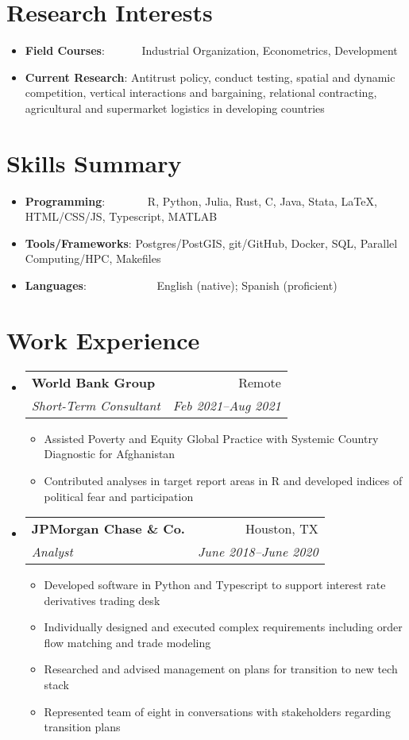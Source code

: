 \documentclass[a4paper,20pt]{article}
\makeatletter
\newcommand{\resumeItem}[2]{
  \item\small{
    \textbf{#1}{: #2 \vspace{-2pt}}
  }
}
\newcommand{\resumeSubheading}[4]{
  \vspace{-1pt}\item
    \begin{tabular*}{0.97\textwidth}{l@{\extracolsep{\fill}}r}
      \textbf{#1} & #2 \\
      \textit{#3} & \textit{#4} \\
    \end{tabular*}\vspace{-5pt}
}
\newcommand{\resumeSubItem}[2]{\resumeItem{#1}{#2}\vspace{-3pt}}
\newcommand{\resumeSubHeadingListStart}{\begin{itemize}[leftmargin=*]}
\newcommand{\resumeSubHeadingListEnd}{\end{itemize}}
\newcommand{\resumeItemListStart}{\begin{itemize}}
\newcommand{\resumeItemListEnd}{\end{itemize}\vspace{-5pt}}
\makeatother
\begin{document}
\section{Research Interests}
\begin{itemize}[leftmargin=*, itemindent=-9em]
  \resumeSubItem{Field Courses}{~~~~~~Industrial Organization, Econometrics, Development}
  \resumeSubItem{Current Research}{Antitrust policy, conduct testing, spatial and dynamic competition, vertical interactions and bargaining, relational contracting, agricultural and supermarket logistics in developing countries}
  \resumeSubHeadingListEnd
	    
\vspace{-5pt}
\section{Skills Summary}
	\resumeSubHeadingListStart
	\resumeSubItem{Programming}{~~~~~~~R, Python, Julia, Rust, C, Java, Stata, LaTeX, HTML/CSS/JS, Typescript, MATLAB}
	\resumeSubItem{Tools/Frameworks}{Postgres/PostGIS, git/GitHub, Docker, SQL, Parallel Computing/HPC, Makefiles}
	\resumeSubItem{Languages}{~~~~~~~~~~~~English (native); Spanish (proficient)}

\resumeSubHeadingListEnd
\vspace{-5pt}
\section{Work Experience}
  \resumeSubHeadingListStart
    \resumeSubheading{World Bank Group}{Remote}
    {Short-Term Consultant}{Feb 2021–Aug 2021}
    \resumeItemListStart
        \item Assisted Poverty and Equity Global Practice with Systemic Country Diagnostic for Afghanistan
        \item Contributed analyses in target report areas in R and developed indices of political fear and participation
      \resumeItemListEnd
    \resumeSubheading
		{JPMorgan Chase \& Co.}{Houston, TX}
		{Analyst}{June 2018–June 2020}
		\resumeItemListStart
        \item 
          {Developed software in Python and Typescript to support interest rate derivatives trading desk}
        \item  
          {Individually designed and executed complex requirements including order flow matching and trade modeling}
        \item {Researched and advised management on plans for transition to new tech stack}
        \item Represented team of eight in conversations with stakeholders regarding transition plans
		\resumeItemListEnd


\end{itemize}
\end{document}
